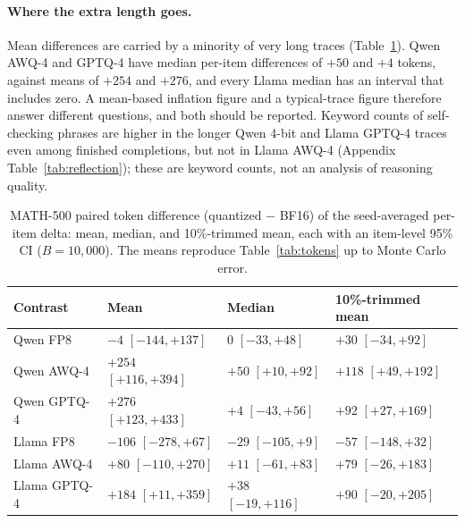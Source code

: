 \documentclass[11pt,a4paper]{article}
\begin{document}
\paragraph{Where the extra length goes.} Mean differences are carried by a minority of very long traces (Table~\ref{tab:toklocation}). Qwen AWQ-4 and GPTQ-4 have median per-item differences of $+50$ and $+4$ tokens, against means of $+254$ and $+276$, and every Llama median has an interval that includes zero. A mean-based inflation figure and a typical-trace figure therefore answer different questions, and both should be reported. Keyword counts of self-checking phrases are higher in the longer Qwen 4-bit and Llama GPTQ-4 traces even among finished completions, but not in Llama AWQ-4 (Appendix Table~\ref{tab:reflection}); these are keyword counts, not an analysis of reasoning quality.

\begin{table}[t]
\centering
\caption{MATH-500 paired token difference (quantized $-$ BF16) of the seed-averaged per-item delta: mean, median, and 10\%-trimmed mean, each with an item-level 95\% CI ($B=10{,}000$). The means reproduce Table~\ref{tab:tokens} up to Monte Carlo error.}
\label{tab:toklocation}
\small
\begin{tabular}{llll}
\toprule
\textbf{Contrast} & \textbf{Mean} & \textbf{Median} & \textbf{10\%-trimmed mean} \\
\midrule
Qwen FP8 & $-4$ $[-144,+137]$ & $0$ $[-33,+48]$ & $+30$ $[-34,+92]$ \\
Qwen AWQ-4 & $+254$ $[+116,+394]$ & $+50$ $[+10,+92]$ & $+118$ $[+49,+192]$ \\
Qwen GPTQ-4 & $+276$ $[+123,+433]$ & $+4$ $[-43,+56]$ & $+92$ $[+27,+169]$ \\
\midrule
Llama FP8 & $-106$ $[-278,+67]$ & $-29$ $[-105,+9]$ & $-57$ $[-148,+32]$ \\
Llama AWQ-4 & $+80$ $[-110,+270]$ & $+11$ $[-61,+83]$ & $+79$ $[-26,+183]$ \\
Llama GPTQ-4 & $+184$ $[+11,+359]$ & $+38$ $[-19,+116]$ & $+90$ $[-20,+205]$ \\
\bottomrule
\end{tabular}
\end{table}
\end{document}

